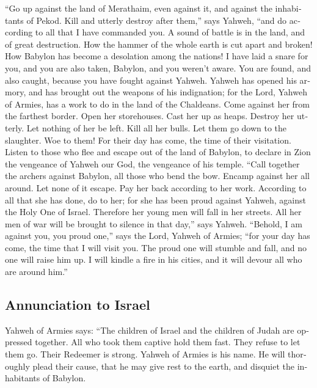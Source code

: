 \begin{paracol}{2}
\begin{otherlanguage}{english}
 ``Go up against the land of Merathaim, even against it,
and against the inhabitants of Pekod. Kill and utterly destroy after
them,'' says Yahweh, ``and do according to all that I have commanded
you.  A sound of battle is in the land, and of great
destruction.  How the hammer of the whole earth is cut
apart and broken! How Babylon has become a desolation among the nations!
 I have laid a snare for you, and you are also taken,
Babylon, and you weren't aware. You are found, and also caught, because
you have fought against Yahweh.  Yahweh has opened his
armory, and has brought out the weapons of his indignation; for the
Lord, Yahweh of Armies, has a work to do in the land of the Chaldeans.
 Come against her from the farthest border. Open her
storehouses. Cast her up as heaps. Destroy her utterly. Let nothing of
her be left.  Kill all her bulls. Let them go down to the
slaughter. Woe to them! For their day has come, the time of their
visitation.  Listen to those who flee and escape out of
the land of Babylon, to declare in Zion the vengeance of Yahweh our God,
the vengeance of his temple.  ``Call together the archers
against Babylon, all those who bend the bow. Encamp against her all
around. Let none of it escape. Pay her back according to her work.
According to all that she has done, do to her; for she has been proud
against Yahweh, against the Holy One of Israel. 
Therefore her young men will fall in her streets. All her men of war
will be brought to silence in that day,'' says Yahweh. 
``Behold, I am against you, you proud one,'' says the Lord, Yahweh of
Armies; ``for your day has come, the time that I will visit you.
 The proud one will stumble and fall, and no one will
raise him up. I will kindle a fire in his cities, and it will devour all
who are around him.''

\hypertarget{annunciation-to-israel}{%
\subsection{Annunciation to Israel}\label{annunciation-to-israel}}

 Yahweh of Armies says: ``The children of Israel and the
children of Judah are oppressed together. All who took them captive hold
them fast. They refuse to let them go.  Their Redeemer is
strong. Yahweh of Armies is his name. He will thoroughly plead their
cause, that he may give rest to the earth, and disquiet the inhabitants
of Babylon.


\end{otherlanguage}
\end{paracol}
